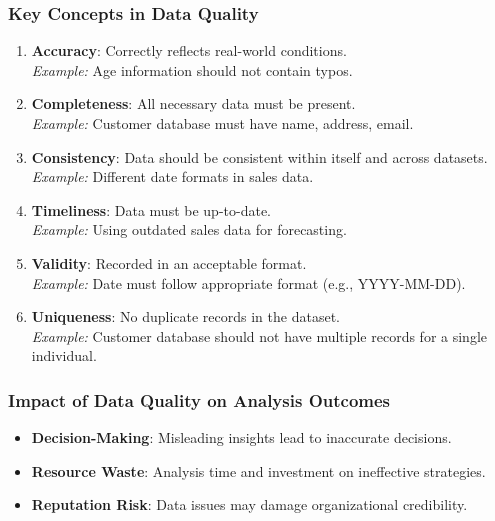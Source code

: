 \documentclass{beamer}
\begin{document}
\begin{frame}[fragile]
    \frametitle{Key Concepts in Data Quality}
    \begin{enumerate}
        \item \textbf{Accuracy}: Correctly reflects real-world conditions. \\
          \textit{Example:} Age information should not contain typos.
        
        \item \textbf{Completeness}: All necessary data must be present. \\
          \textit{Example:} Customer database must have name, address, email.
        
        \item \textbf{Consistency}: Data should be consistent within itself and across datasets. \\
          \textit{Example:} Different date formats in sales data.
        
        \item \textbf{Timeliness}: Data must be up-to-date. \\
          \textit{Example:} Using outdated sales data for forecasting.
        
        \item \textbf{Validity}: Recorded in an acceptable format. \\
          \textit{Example:} Date must follow appropriate format (e.g., YYYY-MM-DD).
        
        \item \textbf{Uniqueness}: No duplicate records in the dataset. \\
          \textit{Example:} Customer database should not have multiple records for a single individual.
    \end{enumerate}
\end{frame}

\begin{frame}[fragile]
    \frametitle{Impact of Data Quality on Analysis Outcomes}
    \begin{itemize}
        \item \textbf{Decision-Making}: Misleading insights lead to inaccurate decisions.
        \item \textbf{Resource Waste}: Analysis time and investment on ineffective strategies.
        \item \textbf{Reputation Risk}: Data issues may damage organizational credibility.
    \end{itemize}
\end{frame}
\end{document}

